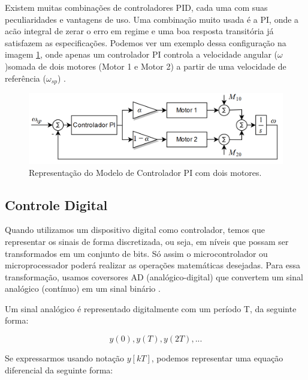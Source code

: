 Existem muitas combinações de controladores PID, cada uma com suas peculiaridades e vantagens de uso. Uma combinação muito usada é a PI, onde a acão integral de zerar o erro em regime e uma boa resposta transitória já satisfazem as especificações. Podemos ver um exemplo dessa configuração na imagem \ref{fig:pi_twomotors_astrom_p308}, onde apenas um controlador PI controla a velocidade angular (\textit{$\omega$})somada de dois motores (Motor 1 e Motor 2) a partir de uma velocidade de referência (\textit{$\omega_{sp}$}) \cite{Astrom1995}.

\begin{figure}[H]
  \caption{Representação do Modelo de Controlador PI com dois motores.}
  \begin{center}
      \includegraphics[scale=0.55]{img/pi_twomotors_astrom_p308}
  \end{center}
  \label{fig:pi_twomotors_astrom_p308}
\end{figure}



\subsection{Controle Digital}

Quando utilizamos um dispositivo digital como controlador, temos que representar os sinais de forma discretizada, ou seja, em níveis que possam ser transformados em um conjunto de bits. Só assim o microcontrolador ou microprocessador poderá realizar as operações matemáticas desejadas. Para essa transformação, usamos coversores AD (analógico-digital) que convertem um sinal analógico (contínuo) em um sinal binário \cite{BongWie2001}.

Um sinal analógico é representado digitalmente com um período T, da seguinte forma:

\begin{equation}
  y(0), y(T), y(2T), ...
\end{equation}

Se expressarmos usando notação ${y[kT]}$, podemos representar uma equação diferencial da seguinte forma:

